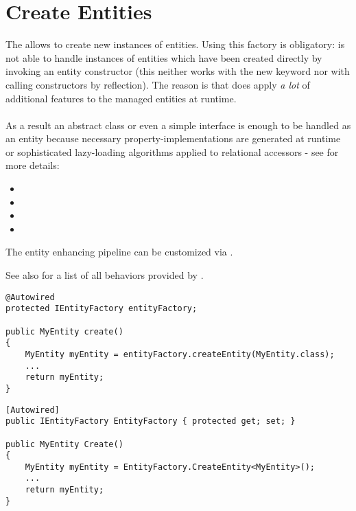 \section{Create Entities}
\label{feature:EntityFactory}
\ClearAPI
The  allows to create new instances of entities. Using this factory is obligatory: \AMBETH{} is not able to handle instances of entities which have been created directly by invoking an entity constructor (this neither works with the new keyword nor with calling constructors by reflection). The reason is that \AMBETH{} does apply \emph{a lot} of additional features to the managed entities at runtime.\\\\

As a result an abstract class or even a simple interface is enough to be handled as an \AMBETH{} entity because necessary property-implementations are generated at runtime or sophisticated lazy-loading algorithms applied to relational accessors - see for more details:

\begin{itemize}
	\item {}
	\item {}
	\item {}
	\item {}
\end{itemize}

The entity enhancing pipeline can be customized via .

See also  for a list of all behaviors provided by \AMBETH{}.


\begin{lstlisting}[style=Java,caption={Usage example for \type{EntityFactory} (Java)}]
@Autowired
protected IEntityFactory entityFactory;

public MyEntity create()
{
	MyEntity myEntity = entityFactory.createEntity(MyEntity.class);
	...
	return myEntity;
}
\end{lstlisting}
\begin{lstlisting}[style=Csharp,caption={Usage example for \type{EntityFactory} (C\#)}]
[Autowired]
public IEntityFactory EntityFactory { protected get; set; }

public MyEntity Create()
{
	MyEntity myEntity = EntityFactory.CreateEntity<MyEntity>();
	...
	return myEntity;
}
\end{lstlisting}
